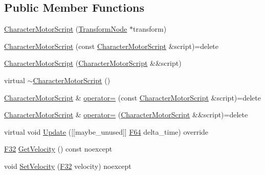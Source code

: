 \subsection*{Public Member Functions}
\begin{DoxyCompactItemize}
\item 
\hyperlink{classmage_1_1script_1_1_character_motor_script_a5bc6ed6c6396056d784fb641c12c8d6d}{Character\+Motor\+Script} (\hyperlink{classmage_1_1_transform_node}{Transform\+Node} $\ast$transform)
\item 
\hyperlink{classmage_1_1script_1_1_character_motor_script_abfeb49ef88503f3c86788c042438d69e}{Character\+Motor\+Script} (const \hyperlink{classmage_1_1script_1_1_character_motor_script}{Character\+Motor\+Script} \&script)=delete
\item 
\hyperlink{classmage_1_1script_1_1_character_motor_script_ab517e47de6dd2511cc55bd5e49dd5b40}{Character\+Motor\+Script} (\hyperlink{classmage_1_1script_1_1_character_motor_script}{Character\+Motor\+Script} \&\&script)
\item 
virtual \hyperlink{classmage_1_1script_1_1_character_motor_script_a83ed3c2fcb60cef046499fd9c44f86ee}{$\sim$\+Character\+Motor\+Script} ()
\item 
\hyperlink{classmage_1_1script_1_1_character_motor_script}{Character\+Motor\+Script} \& \hyperlink{classmage_1_1script_1_1_character_motor_script_ac0367e5e6fb8adfe3b9a962f1ca72b4c}{operator=} (const \hyperlink{classmage_1_1script_1_1_character_motor_script}{Character\+Motor\+Script} \&script)=delete
\item 
\hyperlink{classmage_1_1script_1_1_character_motor_script}{Character\+Motor\+Script} \& \hyperlink{classmage_1_1script_1_1_character_motor_script_a00ca2aa38ca4a2557a783ffc31068801}{operator=} (\hyperlink{classmage_1_1script_1_1_character_motor_script}{Character\+Motor\+Script} \&\&script)=delete
\item 
virtual void \hyperlink{classmage_1_1script_1_1_character_motor_script_a75683c4b8db184174b48dd7e4989c016}{Update} (\mbox{[}\mbox{[}maybe\+\_\+unused\mbox{]}\mbox{]} \hyperlink{namespacemage_ad26233bbec640deda836e572c1a23708}{F64} delta\+\_\+time) override
\item 
\hyperlink{namespacemage_aa97e833b45f06d60a0a9c4fc22ae02c0}{F32} \hyperlink{classmage_1_1script_1_1_character_motor_script_a24edb3337af40e7326c424bc6b93c3fa}{Get\+Velocity} () const noexcept
\item 
void \hyperlink{classmage_1_1script_1_1_character_motor_script_a51c9b8317670fc0ae554bfb0cac11aee}{Set\+Velocity} (\hyperlink{namespacemage_aa97e833b45f06d60a0a9c4fc22ae02c0}{F32} velocity) noexcept
\end{DoxyCompactItemize}
